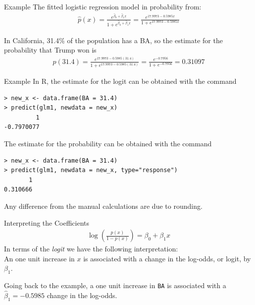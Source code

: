 \documentclass[10pt]{beamer}\usepackage[]{graphicx}\usepackage[]{color}
\begin{document}
\begin{frame}{Example}
The fitted logistic regression model in probability from:
\begin{align*}
\hat{p}(x) =  \frac{e^{\hat{\beta}_0 + \hat{\beta}_1 x}}{1 + e^{\hat{\beta}_0 + \hat{\beta}_1 x}}
= \frac{e^{17.9973 - 0.5985 x}}{1 + e^{17.9973 - 0.5985 x}}
\end{align*}
\vspace{10pt}

In California, 31.4\% of the population has a BA, so the estimate for the probability that Trump won is
\begin{align*}
\hat{p}(31.4) = \frac{e^{17.9973 - 0.5985(31.4)}}{1 + e^{17.9973 - 0.5985(31.4)}}
= \frac{e^{-0.7956}}{1+e^{-0.7956}} = 0.31097
\end{align*}
\end{frame}

\begin{frame}[fragile]{Example}
In R, the estimate for the logit can be obtained with the command
\begin{verbatim}
> new_x <- data.frame(BA = 31.4)
> predict(glm1, newdata = new_x)
         1 
-0.7970077 
\end{verbatim}
\vspace{10pt}

The estimate for the probability can be obtained with the command
\begin{verbatim}
> new_x <- data.frame(BA = 31.4)
> predict(glm1, newdata = new_x, type="response")
       1 
0.310666 
\end{verbatim}
\vspace{10pt}

Any difference from the manual calculations are due to rounding.
\end{frame}

\begin{frame}{Interpreting the Coefficients}
\begin{align*}
\log\left( \frac{p(x)}{1-p(x)} \right) = \beta_0 + \beta_1 x
\end{align*}
In terms of the \emph{logit} we have the following interpretation:\\
\vspace{5pt}
An one unit increase in $x$ is associated with a change in the log-odds, or logit, by $\beta_1$.\\  
\vspace{10pt}

Going back to the example, a one unit increase in \texttt{BA} is associated with a $\hat{\beta}_1 = -0.5985$ change in the log-odds.  
\end{frame}
\end{document}

